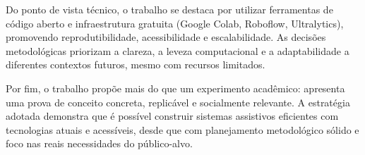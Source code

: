 Do ponto de vista técnico, o trabalho se destaca por utilizar ferramentas de código aberto e infraestrutura gratuita (Google Colab, Roboflow, Ultralytics), promovendo reprodutibilidade, acessibilidade e escalabilidade. As decisões metodológicas priorizam a clareza, a leveza computacional e a adaptabilidade a diferentes contextos futuros, mesmo com recursos limitados.

Por fim, o trabalho propõe mais do que um experimento acadêmico: apresenta uma prova de conceito concreta, replicável e socialmente relevante. A estratégia adotada demonstra que é possível construir sistemas assistivos eficientes com tecnologias atuais e acessíveis, desde que com planejamento metodológico sólido e foco nas reais necessidades do público-alvo.